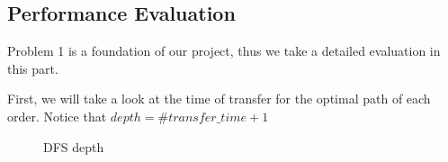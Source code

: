 \documentclass{llncs}
\begin{document}
\subsection{Performance Evaluation}
Problem 1 is a foundation of our project, thus we take a detailed evaluation in this part. \par
First, we will take a look at the time of transfer for the optimal path of each order. Notice that $depth=\#transfer\_time+1$
\begin{figure}[htbp]
  \centering
  \centering
  \caption{DFS depth}
\end{figure}
\end{document}
